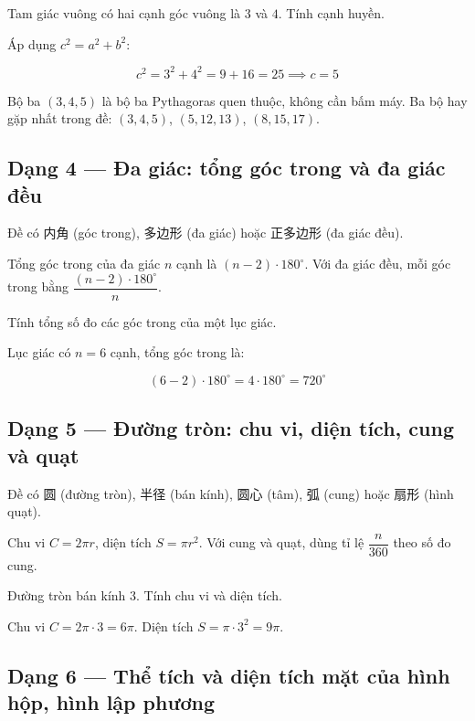 \documentclass[11pt, a4paper]{article}
\begin{document}
\begin{vidu}[{3}]
Tam giác vuông có hai cạnh góc vuông là $3$ và $4$. Tính cạnh huyền.

Áp dụng $c^2 = a^2 + b^2$:

$$c^2 = 3^2 + 4^2 = 9 + 16 = 25 \implies c = 5$$

 Bộ ba $(3,4,5)$ là bộ ba Pythagoras quen thuộc, không cần bấm máy. Ba bộ hay gặp nhất trong đề: $(3,4,5)$, $(5,12,13)$, $(8,15,17)$.

\end{vidu}
\subsection{Dạng 4 — Đa giác: tổng góc trong và đa giác đều}

 Đề có 内角 (góc trong), 多边形 (đa giác) hoặc 正多边形 (đa giác đều).

 Tổng góc trong của đa giác $n$ cạnh là $(n-2) \cdot 180^\circ$. Với đa giác đều, mỗi góc trong bằng $\dfrac{(n-2) \cdot 180^\circ}{n}$.

\begin{vidu}[{4}]
Tính tổng số đo các góc trong của một lục giác.

Lục giác có $n = 6$ cạnh, tổng góc trong là:

$$(6-2) \cdot 180^\circ = 4 \cdot 180^\circ = 720^\circ$$

\end{vidu}
\subsection{Dạng 5 — Đường tròn: chu vi, diện tích, cung và quạt}

 Đề có 圆 (đường tròn), 半径 (bán kính), 圆心 (tâm), 弧 (cung) hoặc 扇形 (hình quạt).

 Chu vi $C = 2\pi r$, diện tích $S = \pi r^2$. Với cung và quạt, dùng tỉ lệ $\dfrac{n}{360}$ theo số đo cung.

\begin{vidu}[{5}]
Đường tròn bán kính $3$. Tính chu vi và diện tích.

Chu vi $C = 2\pi \cdot 3 = 6\pi$. Diện tích $S = \pi \cdot 3^2 = 9\pi$.

\end{vidu}
\subsection{Dạng 6 — Thể tích và diện tích mặt của hình hộp, hình lập phương}
\end{document}
